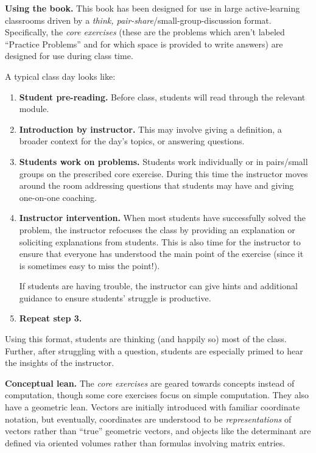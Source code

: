 {\bf Using the book.} This book has been designed for use in large 
active-learning classrooms driven by a \emph{think, pair-share}/small-group-discussion format.
Specifically, the \emph{core exercises} (these are the problems which aren't labeled ``Practice Problems''
and for which space is provided to write answers) are designed for use during class time.

A typical class day looks like:
\begin{enumerate}
	\item {\bf Student pre-reading.} Before class, students will read through the relevant module.

	\item {\bf Introduction by instructor.} This may involve giving a definition,
		a broader context for the day's topics, or answering questions.

	\item {\bf Students work on problems.} Students work individually or in pairs/small groups
		on the prescribed core exercise. During this time the instructor moves
		around the room addressing questions that students may have and giving
		one-on-one coaching.

	\item {\bf Instructor intervention.} When most students have successfully solved
		the problem, the instructor refocuses the class by providing an
		explanation or soliciting explanations from students.
		This is also time for the instructor to ensure that everyone has
		understood the main point of the exercise (since it is sometimes
		easy to miss the point!).

		If students are having trouble, the instructor can give hints
		and additional guidance to ensure students' struggle is productive.

	\item {\bf Repeat step 3.}
\end{enumerate}

Using this format, students are thinking (and happily so) most of the class. Further,
after struggling with a question, students are especially primed to hear the insights of the instructor.

{\bf Conceptual lean.}
The \emph{core exercises} are geared towards concepts instead of computation, though some core exercises
focus on simple computation. They also have a geometric lean. Vectors are initially
introduced with familiar coordinate notation, but eventually, coordinates are understood to be
\emph{representations} of vectors rather than ``true'' geometric vectors, and objects like the
determinant are defined via oriented volumes rather than formulas involving matrix entries.

